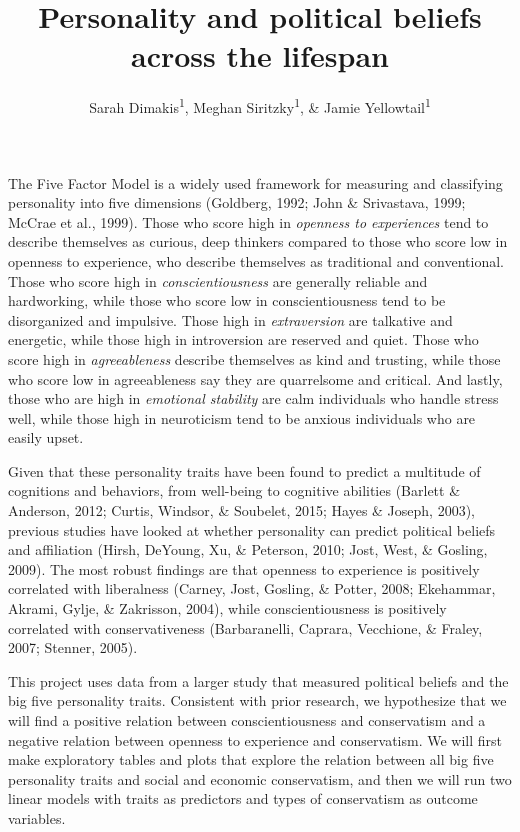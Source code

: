 \documentclass[man]{apa6}
\title{Personality and political beliefs across the lifespan}
\author{Sarah Dimakis\textsuperscript{1}, Meghan Siritzky\textsuperscript{1}, \& Jamie Yellowtail\textsuperscript{1}}
\date{}
\affiliation{
\vspace{0.5cm}
\textsuperscript{1} University of Oregon}
\begin{document}
\maketitle

The Five Factor Model is a widely used framework for measuring and classifying personality into five dimensions (Goldberg, 1992; John \& Srivastava, 1999; McCrae et al., 1999). Those who score high in \emph{openness to experiences} tend to describe themselves as curious, deep thinkers compared to those who score low in openness to experience, who describe themselves as traditional and conventional. Those who score high in \emph{conscientiousness} are generally reliable and hardworking, while those who score low in conscientiousness tend to be disorganized and impulsive. Those high in \emph{extraversion} are talkative and energetic, while those high in introversion are reserved and quiet. Those who score high in \emph{agreeableness} describe themselves as kind and trusting, while those who score low in agreeableness say they are quarrelsome and critical. And lastly, those who are high in \emph{emotional stability} are calm individuals who handle stress well, while those high in neuroticism tend to be anxious individuals who are easily upset.

Given that these personality traits have been found to predict a multitude of cognitions and behaviors, from well-being to cognitive abilities (Barlett \& Anderson, 2012; Curtis, Windsor, \& Soubelet, 2015; Hayes \& Joseph, 2003), previous studies have looked at whether personality can predict political beliefs and affiliation (Hirsh, DeYoung, Xu, \& Peterson, 2010; Jost, West, \& Gosling, 2009). The most robust findings are that openness to experience is positively correlated with liberalness (Carney, Jost, Gosling, \& Potter, 2008; Ekehammar, Akrami, Gylje, \& Zakrisson, 2004), while conscientiousness is positively correlated with conservativeness (Barbaranelli, Caprara, Vecchione, \& Fraley, 2007; Stenner, 2005).

This project uses data from a larger study that measured political beliefs and the big five personality traits. Consistent with prior research, we hypothesize that we will find a positive relation between conscientiousness and conservatism and a negative relation between openness to experience and conservatism. We will first make exploratory tables and plots that explore the relation between all big five personality traits and social and economic conservatism, and then we will run two linear models with traits as predictors and types of conservatism as outcome variables.
\end{document}
